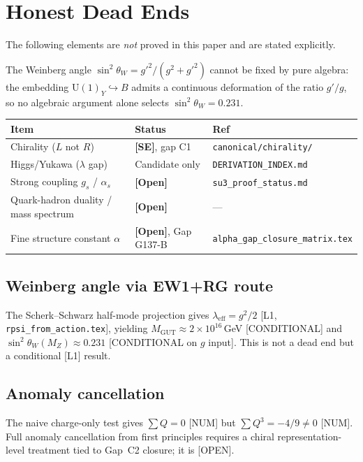 \documentclass[12pt,a4paper]{article}
\theoremstyle{definition}
\theoremstyle{remark}
\newcommand{\OPEN}{\textbf{[Open]}}
\newcommand{\SE}{\textbf{[SE]}}
\begin{document}
\section{Honest Dead Ends}
\label{sec:open}

The following elements are \emph{not} proved in this paper and are
stated explicitly.

The Weinberg angle $\sin^2\theta_W = g'^2/(g^2+g'^2)$ cannot be fixed by pure algebra: the embedding $\mathrm{U}(1)_Y\hookrightarrow B$ admits a continuous deformation of the ratio $g'/g$, so no algebraic argument alone selects $\sin^2\theta_W = 0.231$.

\begin{tcolorbox}[colback=orange!5!white,colframe=orange!55!black,
  title={Open Problems},breakable]
\begin{center}
\begin{tabular}{lll}
\toprule
\textbf{Item} & \textbf{Status} & \textbf{Ref} \\
\midrule
Chirality ($L$ not $R$) & \SE, gap C1
  & \texttt{canonical/chirality/} \\
Higgs/Yukawa ($\lambda$ gap) & Candidate only
  & \texttt{DERIVATION\_INDEX.md} \\
Strong coupling $g_s$ / $\alpha_s$ & \OPEN
  & \texttt{su3\_proof\_status.md} \\
Quark-hadron duality / mass spectrum & \OPEN & --- \\
Fine structure constant $\alpha$ & \OPEN, Gap G137-B
  & \texttt{alpha\_gap\_closure\_matrix.tex} \\
\bottomrule
\end{tabular}
\end{center}
\end{tcolorbox}

\subsection*{Weinberg angle via EW1+RG route}
The Scherk--Schwarz half-mode projection gives
$\lambda_{\mathrm{eff}} = g^2/2$ [L1, \texttt{rpsi\_from\_action.tex}],
yielding $M_{\mathrm{GUT}}\approx 2\times10^{16}$\,GeV [CONDITIONAL]
and $\sin^2\theta_W(M_Z)\approx 0.231$ [CONDITIONAL on $g$ input].
This is not a dead end but a conditional [L1] result.

\subsection*{Anomaly cancellation}
The naive charge-only test gives $\sum Q=0$ [NUM] but
$\sum Q^3 = -4/9 \neq 0$ [NUM].
Full anomaly cancellation from first principles requires a chiral
representation-level treatment tied to Gap~C2 closure; it is [OPEN].
\end{document}
